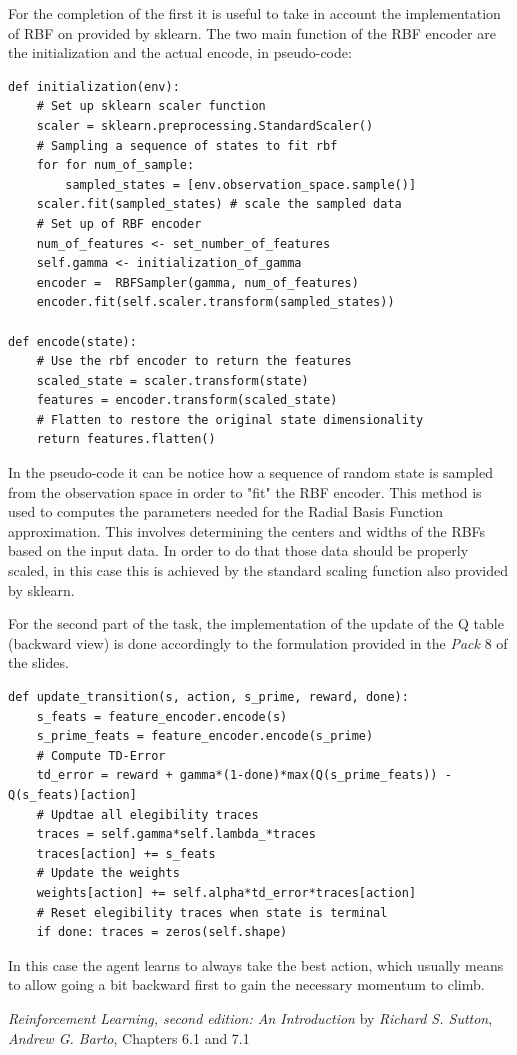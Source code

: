 \documentclass[10pt,a4paper]{article}
\begin{document}
\noindent For the completion of the first it is useful to take in account the implementation of RBF on provided by sklearn. The two main function of the RBF encoder are the initialization and the actual encode, in  pseudo-code:
\begin{lstlisting}
def initialization(env):
    # Set up sklearn scaler function
    scaler = sklearn.preprocessing.StandardScaler()
    # Sampling a sequence of states to fit rbf
    for for num_of_sample:
        sampled_states = [env.observation_space.sample()]
    scaler.fit(sampled_states) # scale the sampled data
    # Set up of RBF encoder
    num_of_features <- set_number_of_features
    self.gamma <- initialization_of_gamma
    encoder =  RBFSampler(gamma, num_of_features)
    encoder.fit(self.scaler.transform(sampled_states))

def encode(state):
    # Use the rbf encoder to return the features
    scaled_state = scaler.transform(state)
    features = encoder.transform(scaled_state)
    # Flatten to restore the original state dimensionality
    return features.flatten() 
\end{lstlisting}

\noindent In the pseudo-code it can be notice how a sequence of random state is sampled from the observation space in order to "fit" the RBF encoder. This method is used to computes the parameters needed for the Radial Basis Function approximation. This involves determining the centers and widths of the RBFs based on the input data. In order to do that those data should be properly scaled, in this case this is achieved by the standard scaling function also provided by sklearn.

\newpage
\noindent For the second part of the task, the implementation of the update of the Q table (backward view) is done accordingly to the formulation provided in the \textit{Pack} 8 of the slides. 
\begin{lstlisting}
def update_transition(s, action, s_prime, reward, done):
    s_feats = feature_encoder.encode(s)
    s_prime_feats = feature_encoder.encode(s_prime)
    # Compute TD-Error
    td_error = reward + gamma*(1-done)*max(Q(s_prime_feats)) - Q(s_feats)[action]
    # Updtae all elegibility traces
    traces = self.gamma*self.lambda_*traces
    traces[action] += s_feats
    # Update the weights
    weights[action] += self.alpha*td_error*traces[action]
    # Reset elegibility traces when state is terminal
    if done: traces = zeros(self.shape)
\end{lstlisting}
In this case the agent learns to always take the best action, which usually means to allow going a bit backward first to gain the necessary momentum to climb.
\newpage

\begin{thebibliography}{9}
    \emph{Reinforcement Learning, second edition: An Introduction} by \textit{Richard S. Sutton}, \textit{Andrew G. Barto}, Chapters 6.1 and 7.1 

\end{thebibliography}
\end{document}
